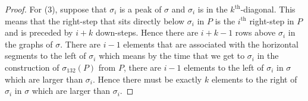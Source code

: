 \documentclass[
final,nomarks
]{dmtcs-episciences}
\begin{document}
\begin{proof}
	
	For (3), suppose that \begin{math}\sigma_i\end{math} is a peak of \begin{math}\sigma\end{math} and \begin{math}\sigma_i\end{math} is in the \begin{math}k^{\mathrm{th}}\end{math}-diagonal.
	This means that the right-step that sits directly below \begin{math}\sigma_i\end{math} in \begin{math}P\end{math} is the  
	\begin{math}i^{\mathrm{th}}\end{math} right-step in \begin{math}P\end{math} and is preceded by \begin{math}i+k\end{math} down-steps. 
	Hence there are \begin{math}i+k-1\end{math} rows above \begin{math}\sigma_i\end{math} in the graphs of \begin{math}\sigma\end{math}. There are \begin{math}i-1\end{math} elements 
	that are associated with the horizontal segments to the left of \begin{math}\sigma_i\end{math} which means by the time that we get to \begin{math}\sigma_i\end{math} in the construction of \begin{math}\sigma_{132}(P)\end{math} from \begin{math}P\end{math}, there are \begin{math}i-1\end{math} elements to 
	the left of \begin{math}\sigma_i\end{math} in \begin{math}\sigma\end{math} which are larger than \begin{math}\sigma_i\end{math}. Hence there must be exactly \begin{math}k\end{math} elements 
	to the right of \begin{math}\sigma_i\end{math} in \begin{math}\sigma\end{math} which are larger than \begin{math}\sigma_i\end{math}. 
\end{proof}
\end{document}
